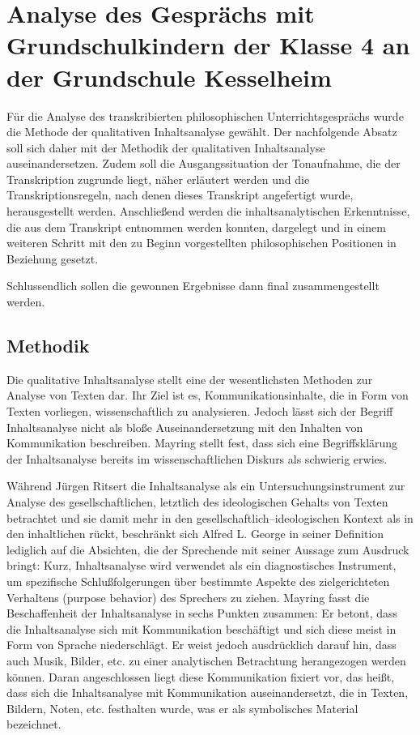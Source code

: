 \section{Analyse des Gesprächs mit Grundschulkindern der Klasse 4 an der Grundschule Kesselheim}

Für die Analyse des transkribierten philosophischen Unterrichtsgesprächs wurde die Methode der qualitativen Inhaltsanalyse gewählt. 
Der nachfolgende Absatz soll sich daher mit der Methodik der qualitativen Inhaltsanalyse auseinandersetzen. 
Zudem soll die Ausgangssituation der Tonaufnahme, die der Transkription zugrunde liegt, näher erläutert werden und die Transkriptionsregeln, nach denen dieses Transkript angefertigt wurde, herausgestellt werden. 
Anschließend werden die inhaltsanalytischen Erkenntnisse, die aus dem Transkript entnommen werden konnten, dargelegt und in einem weiteren Schritt mit den zu Beginn vorgestellten philosophischen Positionen in Beziehung gesetzt.

Schlussendlich sollen die gewonnen Ergebnisse dann final zusammengestellt werden.


\subsection{ Methodik}

Die qualitative Inhaltsanalyse stellt eine der wesentlichsten Methoden zur Analyse von Texten dar. 
Ihr Ziel ist es, \glqq Kommunikationsinhalte, die in Form von Texten vorliegen, wissenschaftlich zu analysieren.\grqq{}\cite[S.\,20]{WK07}
Jedoch lässt sich der Begriff \glqq Inhaltsanalyse\grqq{} nicht als bloße Auseinandersetzung mit den Inhalten von Kommunikation beschreiben. 
Mayring stellt fest, dass sich eine Begriffsklärung der Inhaltsanalyse bereits im wissenschaftlichen Diskurs als schwierig erwies. 

Während Jürgen Ritsert die Inhaltsanalyse als \glqq ein Untersuchungsinstrument zur Analyse des \glqq gesellschaftlichen\grqq{}, letztlich des \glqq ideologischen Gehalts\grqq{} von Texten\grqq{}\cite[S.\,11]{JR07} betrachtet und sie damit mehr in den gesellschaftlich--ideologischen Kontext als in den inhaltlichen rückt, beschränkt sich Alfred L. George in seiner Definition lediglich auf die Absichten, die der Sprechende mit seiner Aussage zum Ausdruck bringt: 
\glqq Kurz, Inhaltsanalyse wird verwendet als ein diagnostisches Instrument, um spezifische Schlußfolgerungen über bestimmte Aspekte des zielgerichteten Verhaltens (purpose behavior) des Sprechers zu ziehen.\grqq{}\cite[S.\,11]{AG07}
Mayring fasst die Beschaffenheit der Inhaltsanalyse in sechs Punkten zusammen: 
Er betont, dass die Inhaltsanalyse sich mit Kommunikation beschäftigt und sich diese meist in Form von Sprache niederschlägt. 
Er weist jedoch ausdrücklich darauf hin, dass auch Musik, Bilder, etc. zu einer analytischen Betrachtung herangezogen werden können. 
Daran angeschlossen liegt diese Kommunikation fixiert vor, das heißt, dass sich die Inhaltsanalyse mit Kommunikation auseinandersetzt, die in Texten, Bildern, Noten, etc. festhalten wurde, was er als symbolisches Material bezeichnet\cite[S.\,12]{PM07}.

